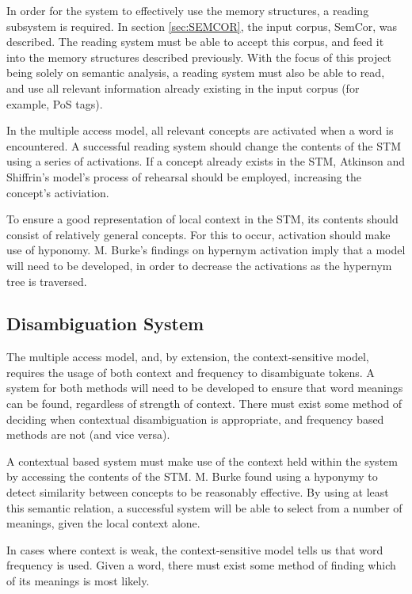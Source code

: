 \documentclass[]{article}
\begin{document}
In order for the system to effectively use the memory structures, a reading subsystem is required. In section \ref{sec:SEMCOR}, the input corpus, SemCor, was described. The reading system must be able to accept  this corpus, and feed it into the memory structures described previously. With the focus of this project being solely on semantic analysis, a reading system must also be able to read, and use all relevant information already existing in the input corpus (for example, PoS tags).

In the multiple access model, all relevant concepts are activated when a word is encountered.  A successful reading system should change the contents of the STM using a series of activations. If a concept already exists in the STM, Atkinson and Shiffrin’s model’s process of rehearsal should be employed, increasing the concept's activiation.  

To ensure a good representation of local context in the STM, its contents should consist of relatively general concepts.  For this to occur, activation should make use of hyponomy. M. Burke’s findings on hypernym activation imply that a model will need to be developed, in order to decrease the activations as the hypernym tree is traversed.

\subsection{Disambiguation System}
\label{sec:PADisambiguate}

The multiple access model, and, by extension, the context-sensitive model, requires the usage of both context and frequency to disambiguate tokens.  A system for both methods will need to be developed to ensure that word meanings can be found, regardless of strength of context. There must exist some method of deciding when contextual disambiguation is appropriate, and frequency based methods are not (and vice versa).

A contextual based system must make use of the context held within the system by accessing the contents of the STM.  M. Burke found using a hyponymy to detect similarity between concepts to be reasonably effective. By using at least this semantic relation, a successful system will be able to select from a number of meanings, given the local context alone.

In cases where context is weak, the context-sensitive model tells us that word frequency is used. Given a word, there must exist some method of finding which of its meanings is most likely. 
\end{document}
